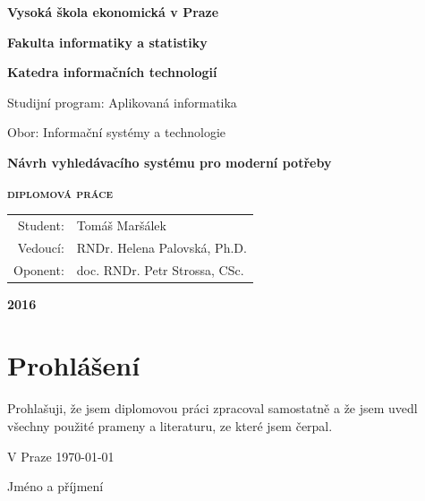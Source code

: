 \documentclass[11pt,letterpaper,oneside,openright]{book}
\begin{document}
\frontmatter

\begin{titlepage}
\thispagestyle{empty}
\centering
\begingroup
{\LARGE\bfseries Vysoká škola ekonomická v Praze\par}
{\Large\bfseries Fakulta informatiky a statistiky\par}
{\Large\bfseries Katedra informačních technologií\par}
\vspace{1.8cm}
{\large Studijní program: Aplikovaná informatika\par}
\vspace{.2em}
{\large Obor: Informační systémy a technologie\par}
\vspace{2.4cm}
{\Huge\bfseries Návrh vyhledávacího systému pro moderní potřeby\par}
\vspace{.5cm}
{\scshape\LARGE\bfseries diplomová práce\par}
\vspace{3.2cm}
\def\arraystretch{1.6}
\begin{tabular}{rl}
{\Large Student:} & {\Large Tomáš Maršálek \par} \\
{\Large Vedoucí:} & {\Large RNDr. Helena Palovská, Ph.D. \par} \\
{\Large Oponent:} & {\Large doc. RNDr. Petr Strossa, CSc. \par} \\
\end{tabular}
\par
\vspace{3.8cm}
{\Large\bfseries 2016\par}
\vfill
\endgroup
\end{titlepage}

\newpage
\chapter*{Prohlášení}
\noindent Prohlašuji, že jsem diplomovou práci zpracoval samostatně a že jsem uvedl
všechny použité prameny a literaturu, ze které jsem čerpal.\par
\vspace{2.4cm}
\noindent V Praze \today \hfill \dotfill \hspace{2em} \par
\hfill \strut Jméno a příjmení \hspace{3.5em} \strut
\end{document}
